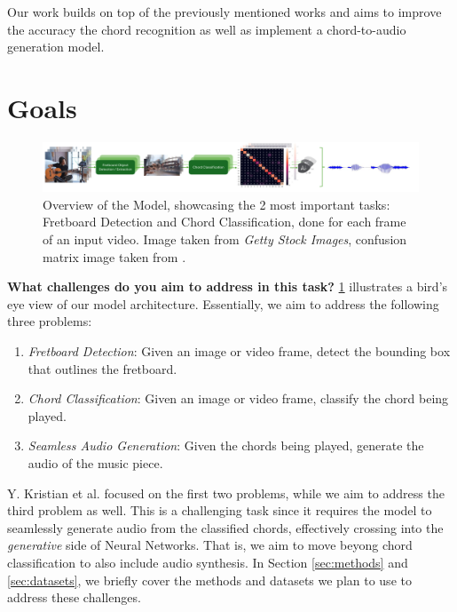 \documentclass[10pt,twocolumn,letterpaper]{article}
\begin{document}
Our work builds on top of the previously mentioned works \cite{Kristian_Zaman_Tenoyo_Jodhinata_2024}
\cite{du2023conditional} and aims to improve the accuracy the chord recognition as well as implement a chord-to-audio generation model.

\section{Goals}

\begin{figure}[h]
    \centering
    \includegraphics[width=\textwidth]{images/task-diagram.pdf}
    \caption{Overview of the Model, showcasing the 2 most important tasks:
        Fretboard Detection and Chord Classification, done for each frame of an input video. Image taken from \textit{Getty Stock Images}, confusion matrix image taken from \cite{Kristian_Zaman_Tenoyo_Jodhinata_2024}.}
    \label{fig:model-diagram}
\end{figure}

\textbf{What challenges do you aim to address in this task?}
\cref{fig:model-diagram} illustrates a bird's eye view of our model architecture. Essentially, we aim to address the following three problems:
\begin{enumerate}[label=\arabic*)]
    \item \emph{Fretboard Detection}: Given an image or video frame, detect the bounding box that outlines the fretboard.
    \item \emph{Chord Classification}: Given an image or video frame, classify the chord being played.
    \item \emph{Seamless Audio Generation}: Given the chords being played, generate the audio of the music piece.
\end{enumerate}
Y. Kristian et al. \cite{Kristian_Zaman_Tenoyo_Jodhinata_2024} focused on the first two problems, while we aim to address the third problem as well. This is a challenging task since it requires the model to seamlessly generate audio from the classified chords, effectively crossing into the \emph{generative} side of Neural Networks. That is, we aim to move beyong chord classification to also include audio synthesis. In Section \cref{sec:methods} and \cref{sec:datasets}, we briefly cover the methods and datasets we plan to use to address these challenges.
\end{document}
